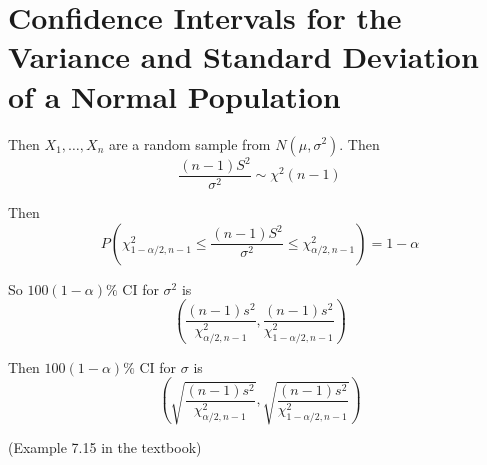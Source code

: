 \section{Confidence Intervals for the Variance and Standard Deviation of a Normal Population}
\begin{theo}
Then $X_1,\dots,X_n$ are a random sample from $N(\mu,\sigma^2)$. Then
\[\frac{(n-1)S^2}{\sigma^2} \sim \chi^2(n-1)\]
\end{theo}

Then
\[P\left(\chi^2_{1-\alpha/2,n-1} \leq \frac{(n-1)S^2}{\sigma^2} \leq \chi^2_{\alpha/2,n-1} \right)=1-\alpha\]

So $100(1-\alpha)\%$ CI for $\sigma^2$ is
\[\left(\frac{(n-1)s^2}{\chi^2_{\alpha/2,n-1}}, \frac{(n-1)s^2}{\chi^2_{1-\alpha/2,n-1}} \right)\]

Then $100(1-\alpha)\%$ CI for $\sigma$ is
\[\left(	\sqrt{\frac{(n-1)s^2}{\chi^2_{\alpha/2,n-1}}}, \sqrt{\frac{(n-1)s^2}{\chi^2_{1-\alpha/2,n-1}}}\right)\]


\begin{exmp}
(Example 7.15 in the textbook)
\end{exmp}